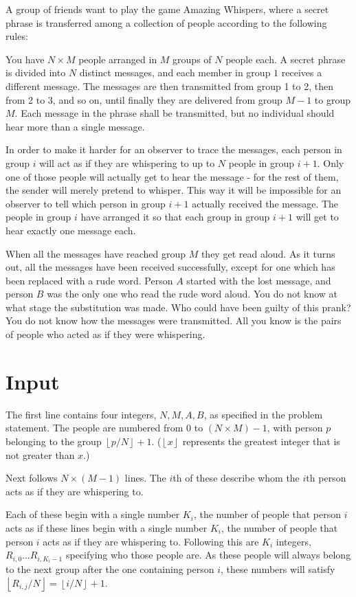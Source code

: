 \noindent
A group of friends want to play the game Amazing Whispers, where a secret phrase is transferred among a collection of people according to the following rules:

You have $N \times M$ people arranged in $M$ groups of $N$ people each.
A secret phrase is divided into $N$ distinct messages, and each member in group $1$ receives a different message. 
The messages are then transmitted from group 1 to 2, then from 2 to 3, and so on,
until finally they are delivered from group $M-1$ to group $M$. Each message in the phrase shall be transmitted, but no individual should hear more than a single message.

In order to make it harder for an observer to trace the messages, each person in group $i$ will 
act as if they are whispering to up to $N$ people in group $i+1$. Only one of those people will 
actually get to hear the message - for the rest of them, the sender will merely pretend to whisper. 
This way it will be impossible for an observer to tell which person in group $i+1$ actually received the message. The people in group $i$ have arranged it so that each group in group $i+1$ will get to hear exactly one message each.

When all the messages have reached group $M$ they get read aloud. As it turns out, all the messages have been received successfully, except for one which has been replaced with a rude word. 
Person $A$ started with the lost message, and person $B$ was the only one who read the rude word aloud. You do not know at what stage the substitution was made. Who could have been guilty of this prank? 
You do not know how the messages were transmitted. All you know is the pairs of people who acted as if they were whispering.

\section*{Input}
The first line contains four integers, $N, M, A, B$, as specified in the problem statement. 
The people are numbered from $0$ to $(N \times M) - 1$, 
with person $p$ belonging to the group $\left \lfloor{p/N}\right \rfloor + 1 $. ($\left \lfloor{x}\right \rfloor$ represents the greatest integer that is not greater than $x$.)

Next follows $N \times (M - 1)$ lines. The $i$th of these describe whom the $i$th person acts as if they are whispering to.

Each of these begin with a single number $K_i$, the number of people that person $i$ acts as if these lines begin with a single number $K_i$, 
the number of people that person $i$ acts as if they are whispering to. Following this are $K_i$ integers, $R_{i,0} \ldots R_{i,K_i-1}$ specifying who those people are.
As these people will always belong to the next group after the one containing person $i$, these numbers will satisfy $\left \lfloor{R_{i,j}/N}\right \rfloor = \left \lfloor{i/N}\right \rfloor + 1$.

